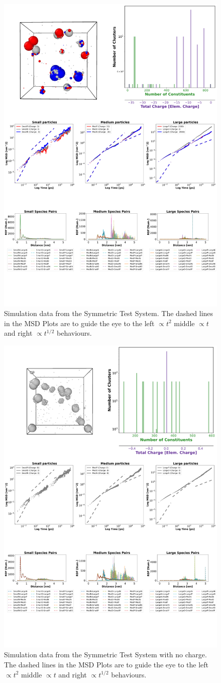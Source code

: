 \documentclass{article}
\begin{document}
\begin{figure}[!htbp]
\centering
\includegraphics[width=0.7\linewidth]{files/Fig4-58e6dad7889c9d6eaaa4abc74e3534eb.png}
\caption[]{Simulation data from the Symmetric Test System. The dashed lines in the MSD Plots are to guide the eye to the left $\propto t^2$ middle $\propto t$ and right $\propto t^{1/2}$ behaviours.}
\label{Fig4_SymTestSys}
\end{figure}

\begin{figure}[!htbp]
\centering
\includegraphics[width=0.7\linewidth]{files/Fig5-85672235d6e59a344ebdc8dfebe8a845.png}
\caption[]{Simulation data from the Symmetric Test System with no charge. The dashed lines in the MSD Plots are to guide the eye to the left $\propto t^2$ middle $\propto t$ and right $\propto t^{1/2}$ behaviours.}
\label{Fig5_NoQSymTestSys}
\end{figure}
\end{document}
